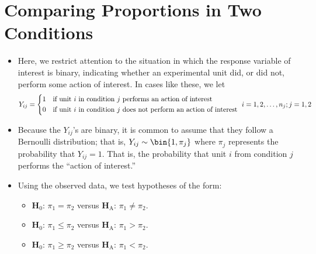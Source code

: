 \section{Comparing Proportions in Two Conditions}
\begin{itemize}
    \item Here, we restrict attention to the situation in which the response variable of interest
          is binary, indicating whether an experimental unit did, or did not, perform
          some action of interest. In cases like these, we let
          \[ Y_{ij}=\begin{cases*}
                  1 & if unit $ i $ in condition $ j $ performs an action of interest         \\
                  0 & if unit $ i $ in condition $ j $ does not perform an action of interest
              \end{cases*}i=1,2,\ldots,n_j;j=1,2 \]
    \item Because the $ Y_{ij} $'s are binary, it is common to assume that they follow
          a Bernoulli distribution; that is, $ Y_{ij}\sim \bin{1,\pi_j} $ where
          $ \pi_j $ represents the probability that $ Y_{ij}=1 $. That is,
          the probability that unit $ i $ from condition $ j $ performs the ``action of interest.''
    \item Using the observed data, we test hypotheses of the form:
          \begin{itemize}
              \item $ \mathbf{H}_0 $: $ \pi_1=\pi_2 $ versus $ \mathbf{H}_\text{A} $: $ \pi_1\ne\pi_2 $.
              \item $ \mathbf{H}_0 $: $ \pi_1\le\pi_2 $ versus $ \mathbf{H}_\text{A} $: $ \pi_1>\pi_2 $.
              \item $ \mathbf{H}_0 $: $ \pi_1\ge\pi_2 $ versus $ \mathbf{H}_\text{A} $: $ \pi_1<\pi_2 $.
          \end{itemize}
\end{itemize}
